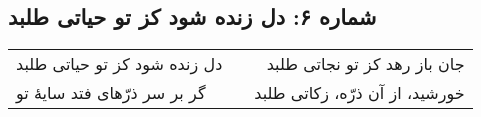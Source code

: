 \begin{center}
\section*{شماره ۶: دل زنده شود کز تو حیاتی طلبد}
\label{sec:006}
\begin{longtable}{l p{0.5cm} r}
دل زنده شود کز تو حیاتی طلبد
&&
جان باز رهد کز تو نجاتی طلبد
\\
گر بر سر ذرّهای فتد سایهٔ تو
&&
خورشید، از آن ذرّه، زکاتی طلبد
\\
\end{longtable}
\end{center}
